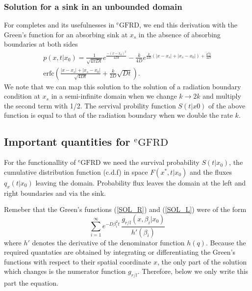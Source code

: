 \subsubsection{Solution for a sink in an unbounded domain}

For completes and its usefulnesses in $^{\mathrm{e}} \mathrm{GFRD}$, we end this derivation with the Green's function for an absorbing sink at $x_s$ in the absence of absorbing boundaries at both sides
\begin{multline}
 p(x,t|x_0) = \frac{1}{\sqrt{4 \pi D t}}e^{\frac{-(x-x_0)^2}{4 D t}} - \frac{k}{4 D}e^{\frac{k}{2 D}(|x-x_s|+|x_s-x_0|)+\frac{k^2 t}{4 D}} \\
\mathrm{erfc}\left( \frac{|x-x_s|+|x_s-x_0|}{\sqrt{4 D t}}+\frac{k}{2D}\sqrt{D t} \right).
\label{FSOL_NB}
\end{multline}
We note that we can map this solution to the solution of a radiation boundary condition at $x_s$ in a semi-infinite domain when we change $k \rightarrow 2 k$ and multiply the second term with 1/2. The servival probility function $S(t|x0)$ of the above function is equal to that of the radiation boundary when we double the rate $k$.

\subsection{Important quantities for $^{\mathrm{e}} \mathrm{GFRD}$}

For the functionallity of $^{\mathrm{e}} \mathrm{GFRD}$ we need the survival probability $S(t|x_0)$, the cumulative distribution function (c.d.f) in space $F(x^*,t|x_0)$ and the fluxes $q_x(t|x_0)$ leaving the domain. Probability flux leaves the domain at the left and right boundaries and via the sink.

Remeber that the Green's functions (\ref{SOL_R}) and (\ref{SOL_L}) were of the form
\begin{equation} 
 \sum_{i=1}^{\infty} e^{-D \beta_i ^2 t} \, \frac{g_{r/l}(x, \beta_i |x_0)}{ h'(\beta_i)}
\end{equation}
where $h'$ denotes the derivative of the denominator function $h(q)$. Because the required quantaties are obtained by integrating or differentiating the Green's functions with respect to their spatial coordinate $x$, the only part of the solution which changes is the numerator function $g_{r/l}$. Therefore, below we only write this part the equation.

